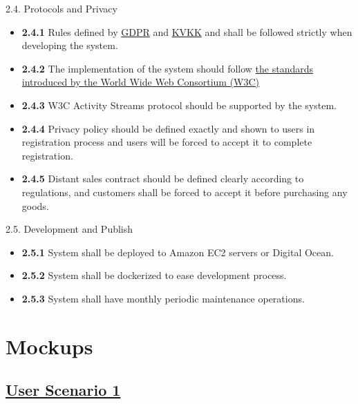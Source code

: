 \documentclass[]{article}
\providecommand{\tightlist}{%
  \setlength{\itemsep}{0pt}\setlength{\parskip}{0pt}}
\begin{document}
2.4. Protocols and Privacy

\begin{itemize}
    \tightlist
    \item
          \textbf{2.4.1} Rules defined by
          \href{https://eur-lex.europa.eu/legal-content/EN/TXT/PDF/?uri=CELEX:32016R0679}{GDPR}
          and \href{https://www.mevzuat.gov.tr/MevzuatMetin/1.5.6698.pdf}{KVKK}
          and shall be followed strictly when developing the system.
    \item
          \textbf{2.4.2} The implementation of the system should follow
          \href{https://www.w3.org/standards/}{the standards introduced by the
              World Wide Web Consortium (W3C)}
    \item
          \textbf{2.4.3} W3C Activity Streams protocol should be supported by
          the system.
    \item
          \textbf{2.4.4} Privacy policy should be defined exactly and shown to
          users in registration process and users will be forced to accept it to
          complete registration.
    \item
          \textbf{2.4.5} Distant sales contract should be defined clearly
          according to regulations, and customers shall be forced to accept it
          before purchasing any goods.
\end{itemize}

2.5. Development and Publish

\begin{itemize}
    \tightlist
    \item
          \textbf{2.5.1} System shall be deployed to Amazon EC2 servers or
          Digital Ocean.
    \item
          \textbf{2.5.2} System shall be dockerized to ease development process.
    \item
          \textbf{2.5.3} System shall have monthly periodic maintenance
          operations.
\end{itemize}

\pagebreak

\hypertarget{mockups}{%
    \section{Mockups}\label{mockups}}

\hypertarget{user-scenario-1}{%
    \subsection{\texorpdfstring{\href{https://github.com/bounswe/bounswe2020group2/wiki/User-Scenario-\%231}{User
                Scenario 1}}{User Scenario 1}}\label{user-scenario-1}}
\end{document}
